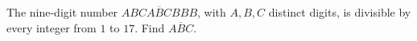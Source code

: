 The nine-digit number $\overline{ABCABCBBB}$, with $A,B,C$ distinct digits, is divisible by every integer from $1$ to $17$. Find $\overline{ABC}$.
